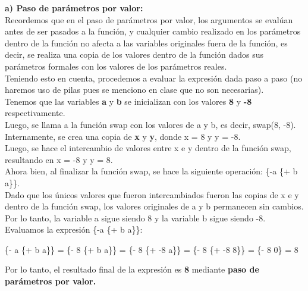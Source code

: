 \documentclass[11pt]{article}
\begin{document}
\begin{enumerate}[leftmargin=0.8cm]
    \textbf{a) Paso de parámetros por valor:}\\
    Recordemos que en el paso de parámetros por valor, los argumentos se evalúan antes de ser pasados a la función, y cualquier cambio realizado en los parámetros dentro de la función no afecta a las variables originales fuera de la función, es decir, se realiza una copia de los valores dentro de la función dados sus parámetros formales con los valores de los parámetros reales.\\
    Teniendo esto en cuenta, procedemos a evaluar la expresión dada paso a paso (no haremos uso de pilas pues se menciono en clase que no son necesarias).\\
    Tenemos que las variables \textbf{a} y \textbf{b} se inicializan con los valores \textbf{8} y \textbf{-8} respectivamente.\\
    Luego, se llama a la función swap con los valores de a y b, es decir, swap(8, -8).\\
    Internamente, se crea una copia de \textbf{x} y \textbf{y}, donde x = 8 y y = -8.\\
    Luego, se hace el intercambio de valores entre x e y dentro de la función swap, resultando en x = -8 y y = 8.\\
    Ahora bien, al finalizar la función swap, se hace la siguiente operación: \{-a \{+ b a\}\}.\\
    Dado que los únicos valores que fueron intercambiados fueron las copias de x e y dentro de la función swap, los valores originales de a y b permanecen sin cambios.\\
    Por lo tanto, la variable a sigue siendo 8 y la variable b sigue siendo -8.\\
    Evaluamos la expresión \{-a \{+ b a\}\}:
    \begin{center}
        \{- a \{+ b a\}\} = \{- 8 \{+ b a\}\} = \{- 8 \{+ -8 a\}\} = \{- 8 \{+ -8 8\}\} = \{- 8 0\} = 8
    \end{center}
    Por lo tanto, el resultado final de la expresión es \textbf{8} mediante \textbf{paso de parámetros por valor.}\\
    


\end{enumerate}
\end{document}
